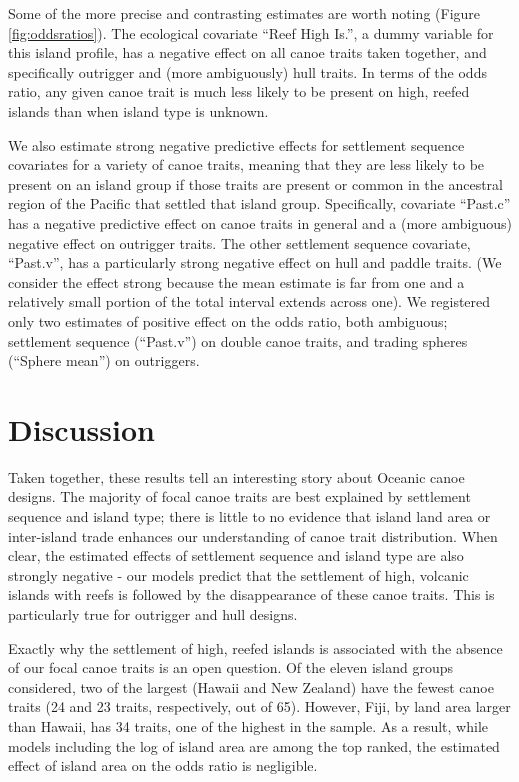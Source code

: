 \documentclass[11pt]{article}
\begin{document}
Some of the more precise and contrasting estimates are worth noting (Figure \ref{fig:oddsratios}). The ecological covariate ``Reef High Is.'', a dummy variable for this island profile, has a negative effect on all canoe traits taken together, and specifically outrigger and (more ambiguously) hull traits. In terms of the odds ratio, any given canoe trait is much less likely to be present on high, reefed islands than when island type is unknown. 

We also estimate strong negative predictive effects for settlement sequence covariates for a variety of canoe traits, meaning that they are less likely to be present on an island group if those traits are present or common in the ancestral region of the Pacific that settled that island group. Specifically, covariate ``Past.c'' has a negative predictive effect on canoe traits in general and a (more ambiguous) negative effect on outrigger traits. The other settlement sequence covariate, ``Past.v'', has a particularly strong negative effect on hull and paddle traits. (We consider the effect strong because the mean estimate is far from one and a relatively small portion of the total interval extends across one). We registered only two estimates of positive effect on the odds ratio, both ambiguous; settlement sequence (``Past.v'') on double canoe traits, and trading spheres (``Sphere mean'') on outriggers. 


\section{Discussion}

Taken together, these results tell an interesting story about Oceanic canoe designs. The majority of focal canoe traits are best explained by settlement sequence and island type; there is little to no evidence that island land area or inter-island trade enhances our understanding of canoe trait distribution. When clear, the estimated effects of settlement sequence and island type are also strongly negative - our models predict that the settlement of high, volcanic islands with reefs is followed by the disappearance of these canoe traits. This is particularly true for outrigger and hull designs.   

Exactly why the settlement of high, reefed islands is associated with the absence of our focal canoe traits is an open question. Of the eleven island groups considered, two of the largest (Hawaii and New Zealand) have the fewest canoe traits (24 and 23 traits, respectively, out of 65). However, Fiji, by land area larger than Hawaii, has 34 traits, one of the highest in the sample. As a result, while models including the log of island area are among the top ranked, the estimated effect of island area on the odds ratio is negligible.
\end{document}
